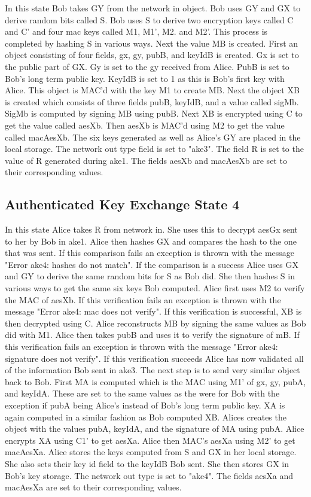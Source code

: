 In this state Bob takes GY from the network in object. Bob uses GY and GX to derive random bits called S. Bob uses S to derive two encryption keys called C and C' and four mac keys called M1, M1', M2. and M2'. This process is completed by hashing S in various ways. Next the value MB is created. First an object consisting of four fields, gx, gy, pubB, and keyIdB is created. Gx is set to the public part of GX. Gy is set to the gy received from Alice. PubB is set to Bob's long term public key. KeyIdB is set to 1 as this is Bob's first key with Alice. This object is MAC'd with the key M1 to create MB. Next the object XB is created which consists of three fields pubB, keyIdB, and a value called sigMb. SigMb is computed by signing MB using pubB. Next XB is encrypted using C to get the value called aesXb. Then aesXb is MAC'd using M2 to get the value called macAesXb. The six keys generated as well as Alice's GY are placed in the local storage. The network out type field is set to "ake3". The field R is set to the value of R generated during ake1. The fields aesXb and macAesXb are set to their corresponding values.


\subsection{Authenticated Key Exchange State 4}


In this state Alice takes R from network in. She uses this to decrypt aesGx sent to her by Bob in ake1. Alice then hashes GX and compares the hash to the one that was sent. If this comparison fails an exception is thrown with the message "Error ake4: hashes do not match". If the comparison is a success Alice uses GX and GY to derive the same random bits for S as Bob did. She then hashes S in various ways to get the same six keys Bob computed. Alice first uses M2 to verify the MAC of aesXb. If this verification fails an exception is thrown with the message "Error ake4: mac does not verify". If this verification is successful, XB is then decrypted using C. Alice reconstructs MB by signing the same values as Bob did with M1. Alice then takes pubB and uses it to verify the signature of mB. If this verification fails an exception is thrown with the message "Error ake4: signature does not verify". If this verification succeeds Alice has now validated all of the information Bob sent in ake3. The next step is to send very similar object back to Bob. First MA is computed which is the MAC using M1' of gx, gy, pubA, and keyIdA. These are set to the same values as the were for Bob with the exception if pubA being Alice's instead of Bob's long term public key. XA is again computed in a similar fashion as Bob computed XB. Alices creates the object with the values pubA, keyIdA, and the signature of MA using pubA. Alice encrypts XA using C1' to get aesXa. Alice then MAC's aesXa using M2' to get macAesXa. Alice stores the keys computed from S and GX in her local storage. She also sets their key id field to the keyIdB Bob sent. She then stores GX in Bob's key storage. The network out type is set to "ake4". The fields aesXa and macAesXa are set to their corresponding values.


